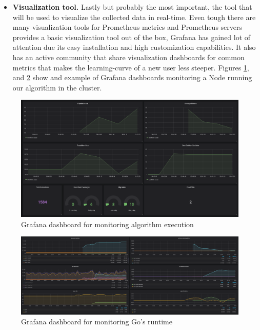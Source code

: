 \begin{itemize}
\begin{lstlisting}[
label={lst:prom_srv_conf},
caption={Content of configuration file for a Prometheus server monitoring a client that exposes its metrics at \textit{127.0.0.1:2222/metrics}. This configuration file is usually located at \textit{/etc/prometheus/prometheus.yml}},
captionpos=b]
scrape_configs:
  - job_name: DistributedEA
    scrape_interval: 10s
    static_configs:
    - targets:
      - 127.0.0.1:2222
\end{lstlisting}
	
	\item \textbf{Visualization tool.} Lastly but probably the most important, the tool that will be used to visualize the collected data in real-time. Even tough there are many visualization tools for Prometheus metrics and Prometheus servers provides a basic visualization tool out of the box, Grafana has gained lot of attention due its easy installation and high customization capabilities. It also has an active community that share visualization dashboards for common metrics that makes the learning-curve of a new user less steeper. Figures \ref{fig:grafana-1}, and \ref{fig:grafana-2} show and example of Grafana dashboards monitoring a Node running our algorithm in the cluster.
\end{itemize}

\begin{figure}[h!]
		\centering
    	\includegraphics[width=\linewidth]{assets/images/grafana-1.png}
    	\caption{Grafana dashboard for monitoring algorithm execution}
    	\label{fig:grafana-1}
\end{figure}

\begin{figure}[h!]
		\centering
    	\includegraphics[width=\linewidth]{assets/images/grafana-2.png}
    	\caption{Grafana dashboard for monitoring Go's runtime}
    	\label{fig:grafana-2}
\end{figure}

